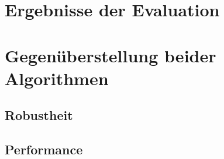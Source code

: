\section{Ergebnisse der Evaluation}
\label{sec:anforderunsevaluierung}


\section{Gegenüberstellung beider Algorithmen}
\label{sec:gegenueberstellung}

\subsection{Robustheit}
\label{subsec:discussion_robsutness}
	

\subsection{Performance}
\label{subsec:discussion_performance}
  

